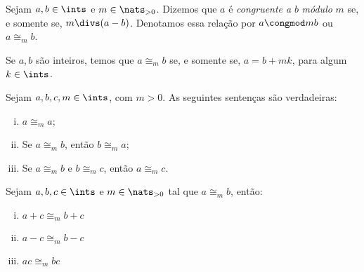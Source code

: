\begin{definition}
    Sejam $a, b \in \ints$ e $m \in \nats_{>0}$. Dizemos que $a$ é
    \emph{congruente a} $b$ \emph{módulo} $m$ se, e somente se, $m \divs (a-b)$.
    Denotamos essa relação por $a \congmod m b$ ou $a \cong_m b$.
\end{definition}

\begin{exercise}
    Se $a, b$ são inteiros, temos que $a \cong_m b$ se, e somente se, $a = b +
    mk$, para algum $k \in \ints$.
\end{exercise}

\begin{exercise}
    Sejam $a,b,c,m \in \ints$, com $m > 0$. As seguintes sentenças são
    verdadeiras:
    \begin{enumerate}[(i)]
        \item $a \cong_m a$;
        \item Se $a \cong_m b$, então $b \cong_m a$;
        \item Se $a \cong_m b$ e $b \cong_m c$, então $a \cong_m c$.
    \end{enumerate}
\end{exercise}

\begin{homework}
    Sejam $a,b,c \in \ints$ e $m \in \nats_{>0}$ tal que $a \cong_m b$, então:
    \begin{enumerate}[(i)]
        \item $a+c \cong_m b+c$
        \item $a-c \cong_m b-c$
        \item $ac \cong_m bc$
    \end{enumerate}
\end{homework}
